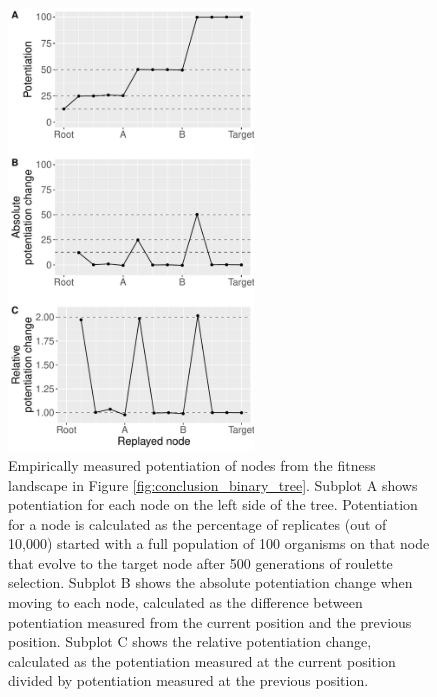 \begin{figure}[h!]
\begin{center}
\includegraphics[width=0.58\textwidth]{06_conclusion/media/combined_plot_10k.pdf}
\end{center}
\caption{ 
Empirically measured potentiation of nodes from the fitness landscape in Figure \ref{fig:conclusion_binary_tree}. 
Subplot A shows potentiation for each node on the left side of the tree. 
Potentiation for a node is calculated as the percentage of replicates (out of 10,000) started with a full population of 100 organisms on that node that evolve to the target node after 500 generations of roulette selection.
Subplot B shows the absolute potentiation change when moving to each node, calculated as the difference between potentiation measured from the current position and the previous position. 
Subplot C shows the relative potentiation change, calculated as the potentiation measured at the current position divided by potentiation measured at the previous position.
}\label{fig:conclusion_diff_types}
\end{figure}

